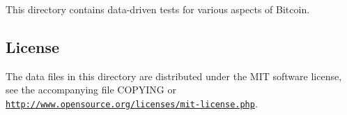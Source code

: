 This directory contains data-\/driven tests for various aspects of Bitcoin.

\subsection*{License }

The data files in this directory are distributed under the M\+IT software license, see the accompanying file C\+O\+P\+Y\+I\+NG or \href{http://www.opensource.org/licenses/mit-license.php}{\tt http\+://www.\+opensource.\+org/licenses/mit-\/license.\+php}. 